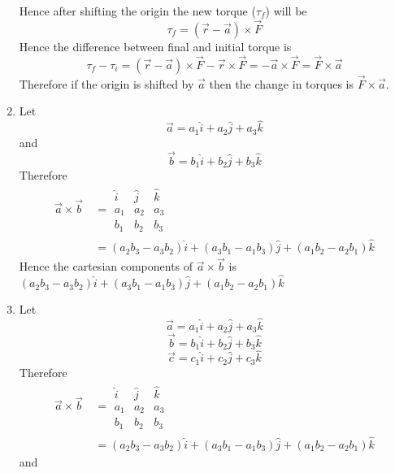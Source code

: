 \documentclass{article}
\begin{document}
\begin{enumerate}
		\begin{center}
		\end{center}
		Hence after shifting the origin the new torque ($\tau_f$) will be$$\tau_f=(\vec{r}-\vec{a})\times \vec{F}$$Hence the difference between final and initial torque is $$\tau_f-\tau_i=(\vec{r}-\vec{a})\times \vec{F}-\vec{r}\times \vec{F}=-\vec{a}\times \vec{F}= \vec{F}\times\vec{a}$$Therefore if the origin is shifted by $\vec{a}$ then the change in torques is $\vec{F}\times\vec{a}$.
		\item Let $$\vec{a}=a_1\hat{i}+a_2\hat{j}+a_3\hat{k}$$and$$\vec{b}=b_1\hat{i}+b_2\hat{j}+b_3\hat{k}$$Therefore
			\begin{align*}
				\vec{a}\times\vec{b}\ &=\begin{array}{|ccc|}
				\hat{i}&\hat{j}&\hat{k}\\
				a_1&a_2&a_3\\
				b_1&b_2&b_3
				\end{array}\\
				&=(a_2b_3-a_3b_2)\hat{i}+(a_3b_1-a_1b_3)\hat{j}+(a_1b_2-a_2b_1)\hat{k}
			\end{align*}Hence the cartesian components of $\vec{a}\times\vec{b}$ is $(a_2b_3-a_3b_2)\hat{i}+(a_3b_1-a_1b_3)\hat{j}+(a_1b_2-a_2b_1)\hat{k}$
		\item Let $$\vec{a}=a_1\hat{i}+a_2\hat{j}+a_3\hat{k}$$ $$\vec{b}=b_1\hat{i}+b_2\hat{j}+b_3\hat{k}$$ $$\vec{c}=c_1\hat{i}+c_2\hat{j}+c_3\hat{k}$$
		Therefore\begin{align*}
			\vec{a}\times\vec{b}\ &=\begin{array}{|ccc|}
				\hat{i}&\hat{j}&\hat{k}\\
				a_1&a_2&a_3\\
				b_1&b_2&b_3
			\end{array}\\
			&=(a_2b_3-a_3b_2)\hat{i}+(a_3b_1-a_1b_3)\hat{j}+(a_1b_2-a_2b_1)\hat{k}
		\end{align*}and\begin{align*}

\end{align*}
\end{enumerate}
\end{document}
